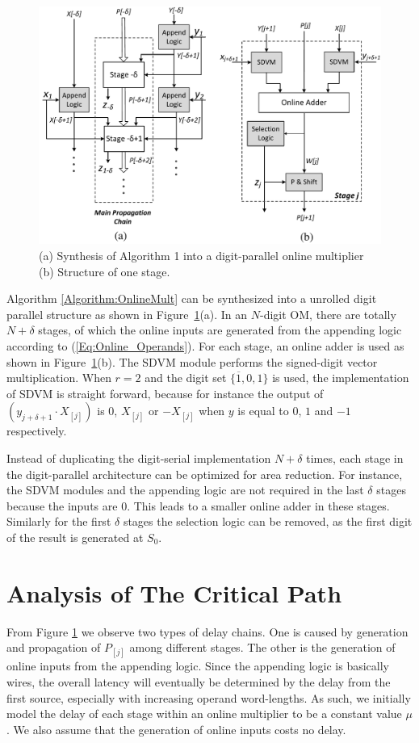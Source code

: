 \documentclass{acm_proc_article-sp}
\begin{document}
\vspace{-2ex}
%
%
\begin{figure}[tbp]
\centering
\includegraphics[width=.49\textwidth]{./Figures/OnlineMult_Unrolled.pdf}
\vspace{-3ex}
\caption{(a) Synthesis of Algorithm 1 into a digit-parallel online multiplier (b) Structure of one stage.}
\label{Fig:Radix2OnlineMultiplier}
\end{figure}

Algorithm \ref{Algorithm:OnlineMult} can be synthesized into a unrolled digit parallel structure as shown in  Figure~\ref{Fig:Radix2OnlineMultiplier}(a). In an $N$-digit OM, there are totally $N+\delta$ stages, of which the online inputs are generated from the appending logic according to (\ref{Eq:Online_Operands}). For each stage, an online adder is used as shown in Figure~\ref{Fig:Radix2OnlineMultiplier}(b). The SDVM module performs the signed-digit vector multiplication. When $r=2$ and the digit set $\{\overline{1},0,1\}$ is used, the implementation of SDVM is straight forward, because for instance the output of $(y_{j+\delta+1}\cdot X_{[j]})$ is 0, $X_{[j]}$ or $-X_{[j]}$ when $y$ is equal to $0$, $1$ and $-1$ respectively.

Instead of duplicating the digit-serial implementation $N+\delta$ times, each stage in the digit-parallel architecture can be optimized for area reduction. For instance, the SDVM modules and the appending logic are not required in the last $\delta$ stages because the inputs are 0. This leads to a smaller online adder in these stages. Similarly for the first $\delta$ stages the selection logic can be removed, as the first digit of the result is generated at $S_0$.

\section{Analysis of The Critical Path}

From Figure \ref{Fig:Radix2OnlineMultiplier} we observe two types of delay chains. One is caused by generation and propagation of $P_{[j]}$ among different stages. The other is the generation of online inputs from the appending logic. Since the appending logic is basically wires, the overall latency will eventually be determined by the delay from the first source, especially with increasing operand word-lengths. As such, we initially model the delay of each stage within an online multiplier to be a constant value $\mu$. We also assume that the generation of online inputs costs no delay.
\end{document}
